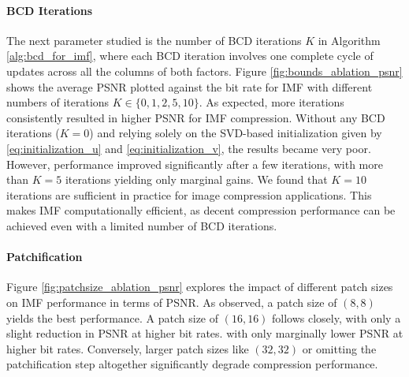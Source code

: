 
\paragraph{BCD Iterations}
The next parameter studied is the number of BCD iterations $K$ in Algorithm \ref{alg:bcd_for_imf}, where each BCD iteration involves one complete cycle of updates across all the columns of both factors. Figure \ref{fig:bounds_ablation_psnr} shows the average PSNR plotted against the bit rate for IMF with different numbers of iterations $K \in \{0, 1, 2, 5, 10\}$. As expected, more iterations consistently resulted in higher PSNR for IMF compression. Without any BCD iterations ($K=0$) and relying solely on the SVD-based initialization given by \eqref{eq:initialization_u} and \eqref{eq:initialization_v}, the results became very poor. However, performance improved significantly after a few iterations, with more than $K=5$ iterations yielding only marginal gains. We found that $K=10$ iterations are sufficient in practice for image compression applications. This makes IMF computationally efficient, as decent compression performance can be achieved even with a limited number of BCD iterations.

\paragraph{Patchification}
Figure \ref{fig:patchsize_ablation_psnr} explores the impact of different patch sizes on IMF performance in terms of PSNR. As observed, a patch size of $(8, 8)$ yields the best performance. A patch size of $(16, 16)$ follows closely, with only a slight reduction in PSNR at higher bit rates. with only marginally lower PSNR at higher bit rates. Conversely, larger patch sizes like $(32, 32)$ or omitting the patchification step altogether significantly degrade compression performance. 

